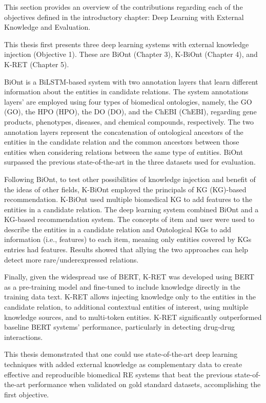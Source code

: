 This section provides an overview of the contributions regarding each of the objectives defined in the introductory chapter: Deep Learning with External Knowledge and Evaluation.

This thesis first presents three deep learning systems with external knowledge injection (Objective 1). These are BiOnt (Chapter 3), K-BiOnt (Chapter 4), and K-RET (Chapter 5).

BiOnt is a BiLSTM-based system with two annotation layers that learn different information about the entities in candidate relations. The system annotations layers' are employed using four types of biomedical ontologies, namely, the \acl{GO} (GO), the \acl{HPO} (HPO), the \acl{DO} (DO), and the \acl{ChEBI} (ChEBI), regarding gene products, phenotypes, diseases, and chemical compounds, respectively. The two annotation layers represent the concatenation of ontological ancestors of the entities in the candidate relation and the common ancestors between those entities when considering relations between the same type of entities. BiOnt surpassed the previous state-of-the-art in the three datasets used for evaluation. 

Following BiOnt, to test other possibilities of knowledge injection and benefit of the ideas of other fields, K-BiOnt employed the principals of \acl{KG} (KG)-based recommendation. K-BiOnt used multiple biomedical \ac{KG} to add features to the entities in a candidate relation. The deep learning system combined BiOnt and a \ac{KG}-based recommendation system. The concepts of item and user were used to describe the entities in a candidate relation and Ontological KGs to add information (i.e., features) to each item, meaning only entities covered by KGs entries had features. Results showed that allying the two approaches can help detect more rare/underexpressed relations. 

Finally, given the widespread use of BERT, K-RET was developed using BERT as a pre-training model and fine-tuned to include knowledge directly in the training data text. K-RET allows injecting knowledge only to the entities in the candidate relation, to additional contextual entities of interest, using multiple knowledge sources, and to multi-token entities. K-RET significantly outperformed baseline BERT systems' performance, particularly in detecting drug-drug interactions. 

This thesis demonstrated that one could use state-of-the-art deep learning techniques with added external knowledge as complementary data to create effective and reproducible biomedical RE systems that beat the previous state-of-the-art performance when validated on gold standard datasets, accomplishing the first objective. 

